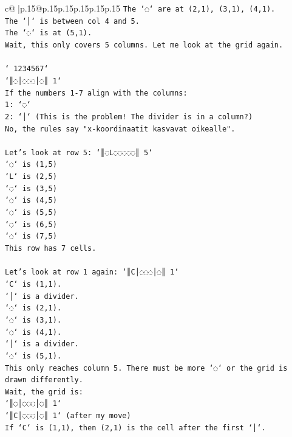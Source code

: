 \documentclass{article}
\begin{document}
{\begin{supertabular}{c@{$\;$}|p{.15\linewidth}@{}p{.15\linewidth}p{.15\linewidth}p{.15\linewidth}p{.15\linewidth}p{.15\linewidth}}
{{{\texttt{The `◌` are at (2,1), (3,1), (4,1).} \\
\texttt{The `│` is between col 4 and 5.} \\
\texttt{The `◌` is at (5,1).} \\
\texttt{Wait, this only covers 5 columns. Let me look at the grid again.} \\
\\ 
\texttt{` 1234567`} \\
\texttt{`║◌│◌◌◌│◌║ 1`} \\
\texttt{If the numbers 1{-}7 align with the columns:} \\
\texttt{1: `◌`} \\
\texttt{2: `│` (This is the problem! The divider is in a column?)} \\
\texttt{No, the rules say "x{-}koordinaatit kasvavat oikealle".} \\
\\ 
\texttt{Let's look at row 5: `║◌L◌◌◌◌◌║ 5`} \\
\texttt{`◌` is (1,5)} \\
\texttt{`L` is (2,5)} \\
\texttt{`◌` is (3,5)} \\
\texttt{`◌` is (4,5)} \\
\texttt{`◌` is (5,5)} \\
\texttt{`◌` is (6,5)} \\
\texttt{`◌` is (7,5)} \\
\texttt{This row has 7 cells.} \\
\\ 
\texttt{Let's look at row 1 again: `║C│◌◌◌│◌║ 1`} \\
\texttt{`C` is (1,1).} \\
\texttt{`│` is a divider.} \\
\texttt{`◌` is (2,1).} \\
\texttt{`◌` is (3,1).} \\
\texttt{`◌` is (4,1).} \\
\texttt{`│` is a divider.} \\
\texttt{`◌` is (5,1).} \\
\texttt{This only reaches column 5. There must be more `◌` or the grid is drawn differently.} \\
\texttt{Wait, the grid is:} \\
\texttt{`║◌│◌◌◌│◌║ 1`} \\
\texttt{`║C│◌◌◌│◌║ 1` (after my move)} \\
\texttt{If `C` is (1,1), then (2,1) is the cell after the first `│`.} \\
}}}
\end{supertabular}}
\end{document}
